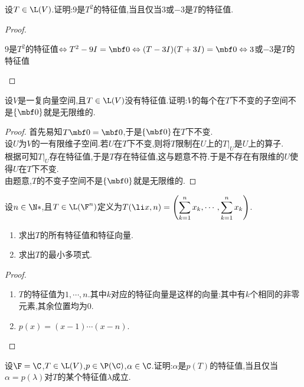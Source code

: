 \documentclass{ctexart}
\begin{document}
\pagestyle{empty}
\begin{center}
    \large{}
\end{center}
\begin{problem}[1.]
    设$T\in\L(V)$.证明:$9$是$T^2$的特征值,当且仅当$3$或$-3$是$T$的特征值.
\end{problem}
\begin{proof}
    \begin{center}
        $9$是$T^2$的特征值$\Leftrightarrow T^2-9I=\mbf0\Leftrightarrow (T-3I)(T+3I)=\mbf0\Leftrightarrow 3$或$-3$是$T$的特征值
    \end{center}
\end{proof}
\begin{problem}[2.]
    设$V$是一复向量空间,且$T\in\L(V)$没有特征值.证明:$V$的每个在$T$下不变的子空间不是$\{\mbf0\}$就是无限维的.
\end{problem}
\begin{proof}
    首先易知$T\mbf0=\mbf0$,于是$\{\mbf0\}$在$T$下不变.\\
    设$U$为$V$的一有限维子空间.若$U$在$T$下不变,则将$T$限制在$U$上的$T|_U$是$U$上的算子.\\
    根据可知$T|_U$存在特征值,于是$T$存在特征值,这与题意不符.于是不存在有限维的$U$使得$U$在$T$下不变.\\
    由题意,$T$的不变子空间不是$\{\mbf0\}$就是无限维的.
\end{proof}
\begin{problem}[3.]
    设$n\in\N*$,且$T\in\L(\F^n)$定义为$\displaystyle T(\li x,n)=\left(\sum_{k=1}^{n}x_k,\cdots,\sum_{k=1}^{n}x_k\right)$.
    \begin{enumerate}[label=\tbf{(\arabic*)}]
        \item 求出$T$的所有特征值和特征向量.
        \item 求出$T$的最小多项式.
    \end{enumerate}
\end{problem}
\begin{proof}
    \begin{enumerate}[label=\tbf{(\arabic*)}]
        \item $T$的特征值为$1,\cdots,n$.其中$k$对应的特征向量是这样的向量:其中有$k$个相同的非零元素,其余位置均为$0$.
        \item $p(x)=(x-1)\cdots(x-n)$.
    \end{enumerate}
\end{proof}
\begin{problem}[4.]
    设$\F=\C$,$T\in\L(V)$,$p\in\P(\C)$,$\alpha\in\C$.证明:$\alpha$是$p(T)$的特征值,当且仅当$\alpha=p(\lambda)$对$T$的某个特征值$\lambda$成立.
\end{problem}
\end{document}
